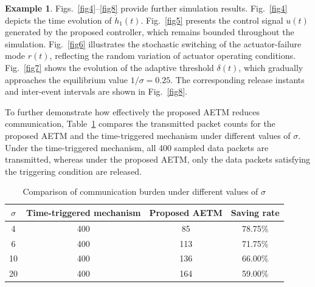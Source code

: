 \documentclass[preprint,review,fleqn,sort&compress,3p]{elsarticle}
\theoremstyle{definition} %
\theoremstyle{definition}%
\newtheorem{example}{Example}
\newif\ifreviewmarkup
\DeclareRobustCommand{\revdel}[1]{\ifreviewmarkup{\color{revisionred}\hypersetup{linkcolor=revisionred,citecolor=revisionred}#1}\fi}
\DeclareRobustCommand{\revadd}[1]{{\ifreviewmarkup\color{revisiongreen}\hypersetup{linkcolor=revisiongreen,citecolor=revisiongreen}\fi#1}}
\begin{document}
\begin{example}
Figs.~\ref{fig4}--\ref{fig8} provide further simulation results.
\label{rev:M44}Fig.~\ref{fig4} depicts the time evolution of $\dot{h}_1(t)$. \revdel{Its bounded transient behavior and convergence to zero indicate that the membership-function derivative information can be effectively exploited in the region-dependent piecewise control design.}
Fig.~\ref{fig5} presents the control signal $u(t)$ generated by the proposed controller, which remains bounded throughout the simulation.
Fig.~\ref{fig6} illustrates the stochastic switching of the actuator-failure mode $r(t)$, reflecting the random variation of actuator operating conditions.
Fig.~\ref{fig7} shows the evolution of the adaptive threshold $\delta(t)$, which gradually approaches the equilibrium value $1/\sigma=0.25$.
The corresponding release instants and inter-event intervals are shown in Fig.~\ref{fig8}.
 
To further demonstrate how effectively the proposed AETM reduces communication,
Table~\ref{tab:sigma_effect} compares the transmitted packet counts for the proposed AETM and the time-triggered mechanism under different values of $\sigma$.
Under the time-triggered mechanism, all 400 sampled data packets are transmitted, whereas under the proposed AETM, only the data packets satisfying the triggering condition are released.
\label{rev:M45}\revdel{These results confirm that the proposed AETM significantly reduces the number of data transmissions.}
\begin{table}[htbp]
	\centering
	\caption{Comparison of communication burden under different values of $\sigma$}
	\label{tab:sigma_effect}
	\begin{tabular}{cccc}
		\toprule
		$\sigma$ & Time-triggered mechanism & Proposed AETM & Saving rate \\
		\midrule
		4  & 400 & 85  & 78.75\% \\
		6  & 400 & 113 & 71.75\% \\
		10 & 400 & 136 & 66.00\% \\
		20 & 400 & 164 & 59.00\% \\
		\bottomrule
	\end{tabular}
\end{table}


\end{example}
\end{document}
